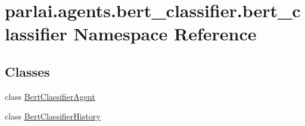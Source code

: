 \hypertarget{namespaceparlai_1_1agents_1_1bert__classifier_1_1bert__classifier}{}\section{parlai.\+agents.\+bert\+\_\+classifier.\+bert\+\_\+classifier Namespace Reference}
\label{namespaceparlai_1_1agents_1_1bert__classifier_1_1bert__classifier}
\subsection*{Classes}
\begin{DoxyCompactItemize}
\item 
class \hyperlink{classparlai_1_1agents_1_1bert__classifier_1_1bert__classifier_1_1BertClassifierAgent}{Bert\+Classifier\+Agent}
\item 
class \hyperlink{classparlai_1_1agents_1_1bert__classifier_1_1bert__classifier_1_1BertClassifierHistory}{Bert\+Classifier\+History}
\end{DoxyCompactItemize}
